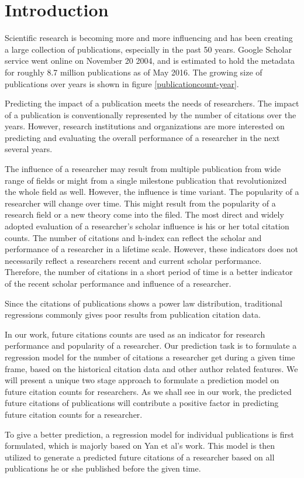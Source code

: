 \section{Introduction}
Scientific research is becoming more and more influencing and has been creating a large collection of publications, especially in the past 50 years.
Google Scholar service went online on November 20 2004, and is estimated to hold the metadata for roughly 8.7 million publications as of May 2016\cite{}.
The growing size of publications over years is shown in figure \ref{publicationcount-year}.

Predicting the impact of a publication meets the needs of researchers. The impact of a publication is conventionally represented by the number of citations over the years.
However, research institutions and organizations are more interested on predicting and evaluating the overall performance of a researcher in the next several years.

The influence of a researcher may result from multiple publication from wide range of fields or might from a single milestone publication that revolutionized the whole field as well. However, the influence is time variant. The popularity of a researcher will change over time. This might result from the popularity of a research field or a new theory come into the filed.
The most direct and widely adopted evaluation of a researcher's scholar influence is his or her total citation counts. The number of citations and h-index can reflect the scholar and performance of a researcher in a lifetime scale\cite{bornmann2007we}. However, these indicators does not necessarily reflect a researchers recent and current scholar performance. Therefore, the number of citations in a short period of time is a better indicator of the recent scholar performance and influence of a researcher.

Since the citations of publications shows a power law distribution, traditional regressions commonly gives poor results from publication citation data\cite{cheng2014can,radicchi2008universality}. 

In our work, future citations counts are used as an indicator for research performance and popularity of a researcher. Our prediction task is to formulate a regression model for the number of citations a researcher get during a given time frame, based on the historical citation data and other author related features. We will present a unique two stage approach to formulate a prediction model on future citation counts for researchers. As we shall see in our work, the predicted future citations of publications will contribute a positive factor in predicting future citation counts for a researcher.

To give a better prediction, a regression model for individual publications is first formulated, which is majorly based on Yan et al's work\cite{yan2011citation}. This model is then utilized to generate a predicted future citations of a researcher based on all publications he or she published before the given time.